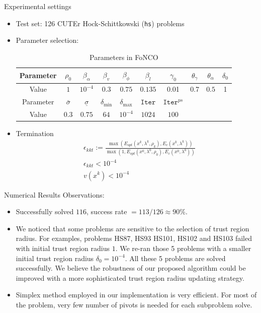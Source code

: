 \documentclass[8pt]{beamer}
\begin{document}
	\begin{frame}{Experimental settings}
		\begin{itemize}
			\item Test set:  126 CUTEr Hock-Schittkowski (\texttt{hs}) problems
		\vfill
			\item Parameter selection:   
				\begin{table}[H]
				\centering
				\caption{Parameters in FoNCO}
				\label{tab.para}
				\begin{tabular}{c|ccccccccc}\hline
					Parameter  & $\rho_0$   &  $\beta_\alpha$  &  $\beta_v$& $\beta_\phi$ & $\beta_l$                  &  $\gamma_0$  &  $\theta_\gamma$   & $\theta_\alpha$    & $\delta_0$    \\ \hline 
					Value   &   $1$    &  $10^{-4}     $  &  $0.3    $& $0.75$       & $0.135$ &     0.01     &  0.7   &   $0.5$  & 1  \\  \hline\hline

				Parameter &      $\bar\sigma$     &  $\underline{\sigma}$  &  $\delta_{\min} $  &    $\delta_{\max}$      & $\texttt{Iter}$ & $\texttt{Iter}^{ps}$  &  & & \\  \hline
					Value &           $0.3$  &   $0.75$  &  $64$       &   $10^{-4}$  &        $1024$   &  $100$ & & & \\  \hline
				\end{tabular}\end{table}
		\vfill
			\item Termination 
				\begin{equation}\label{relative.kkt}\begin{aligned}
					& \epsilon_{kkt} := \frac{\max(E_{opt}(x^k, \lambda^k, \rho_k), E_c(x^k, \lambda^k))}{\max(1, E_{opt}(x^0, \lambda^0, \rho_0), E_c(x^0, \lambda^0))}\\
					& \epsilon_{kkt} < 10^{-4} \\
					& v(x^k) < 10^{-4}
				\end{aligned}\end{equation}
		\end{itemize}
	\end{frame}


	\begin{frame}{Numerical Results}
		Observations: 
		\vfill
		\begin{itemize}
			\item  Successfully solved $116$, success rate   $  = 113/126 \approx 90 \%$. 
		\vfill
			\item  We noticed that some problems are sensitive to the selection of trust region radius. For examples, problems HS87, HS93 HS101, HS102 and HS103 failed with initial trust region radius $1$. We re-ran those 5 problems with a smaller initial trust region radius $\delta_{0} = 10^{-4}$. All these 5 problems are solved successfully. We believe the robustness of our proposed algorithm could be improved with a more sophisticated trust region radius updating strategy. 
		\vfill
			\item Simplex method employed in our implementation is very efficient. For most of the problem, very few number of pivots is needed for each subproblem solve. 
		\end{itemize}
	\end{frame}
\end{document}
